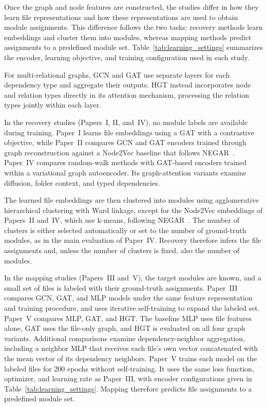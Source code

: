 Once the graph and node features are constructed, the studies differ in how they learn file representations and how these representations are used to obtain module assignments. This difference follows the two tasks: recovery methods learn embeddings and cluster them into modules, whereas mapping methods predict assignments to a predefined module set. Table~\ref{tab:learning_settings} summarizes the encoder, learning objective, and training configuration used in each study.

For multi-relational graphs, GCN and GAT use separate layers for each dependency type and aggregate their outputs. HGT instead incorporates node and relation types directly in its attention mechanism, processing the relation types jointly within each layer.

In the recovery studies (Papers~I, II, and~IV), no module labels are available during training. Paper~I learns file embeddings using a GAT with a contrastive objective, while Paper~II compares GCN and GAT encoders trained through graph reconstruction against a Node2Vec baseline that follows NEGAR~\cite{negar}. Paper~IV compares random-walk methods with GAT-based encoders trained within a variational graph autoencoder. Its graph-attention variants examine diffusion, folder context, and typed dependencies.
 
The learned file embeddings are then clustered into modules using agglomerative hierarchical clustering with Ward linkage, except for the Node2Vec embeddings of Papers~II and~IV, which use k-means, following NEGAR~\cite{negar}. The number of clusters is either selected automatically or set to the number of ground-truth modules, as in the main evaluation of Paper~IV. Recovery therefore infers the file assignments and, unless the number of clusters is fixed, also the number of modules.

In the mapping studies (Papers~III and~V), the target modules are known, and a small set of files is labeled with their ground-truth assignments. Paper~III compares GCN, GAT, and MLP models under the same feature representation and training procedure, and uses iterative self-training to expand the labeled set. Paper~V compares MLP, GAT, and HGT. The baseline MLP uses file features alone, GAT uses the file-only graph, and HGT is evaluated on all four graph variants. Additional comparisons examine dependency-neighbor aggregation, including a neighbor MLP that receives each file's own vector concatenated with the mean vector of its dependency neighbors. Paper~V trains each model on the labeled files for 200 epochs without self-training. It uses the same loss function, optimizer, and learning rate as Paper~III, with encoder configurations given in Table~\ref{tab:learning_settings}. Mapping therefore predicts file assignments to a predefined module set.

